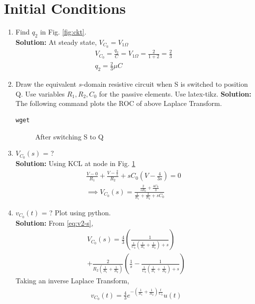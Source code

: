\documentclass[journal,12pt,twocolumn]{IEEEtran}
\newcommand{\solution}{\noindent \textbf{Solution: }}
\providecommand{\brak}[1]{\ensuremath{\left(#1\right)}}
\numberwithin{equation}{section}
\renewcommand\thesection{\arabic{section}}
\begin{document}
 \section{Initial Conditions}
\begin{enumerate}[label=\arabic*.,ref=\thesection.\theenumi]
\item Find $q_2$ in Fig. 
			\ref{fig:ckt}.\\
			\solution At steady state, $V_{C_0}=V_{1 \Omega}$
			\begin{align*}
			V_{C_0}=\frac{q_2}{C}=V_{1 \Omega}=\frac{2}{1+2}=\frac23\\
			q_2=\frac23 \mu C
			\end{align*}
\item Draw the equivalent $s$-domain resistive circuit when S is switched to position Q.  Use variables $R_1, R_2, C_0$ for the passive elements.
Use latex-tikz.
		\label{prob:init}
		\solution 
		The following command plots the ROC of above Laplace Transform.
	\begin{lstlisting}
wget 
\end{lstlisting}
	\begin{figure}[!ht]
 \centering
% 
\caption{After switching S to Q}
\label{fig:sq}
\end{figure}
		\item $V_{C_0}(s)$ = ? \\
		\solution Using KCL at node in Fig. \ref{fig:sq}
\begin{align}
    \frac{V - 0}{R_1} + \frac{V - \frac{2}{s}}{R_2} + sC_0\brak{V - \frac{4}{3s}} = 0 \\
\implies V_{C_0}(s) = \frac{\frac{2}{sR_2} + \frac{4C_0}{3}}{\frac{1}{R_1} + \frac{2}{R_2} + sC_0}
\label{eq:v2-s}
\end{align} 
	\item $v_{C_0}(t)$ = ? Plot using python.\\
	\solution From \eqref{eq:v2-s},
\begin{align}
    &V_{C_0}(s) = \frac{4}{3}\brak{\frac{1}{\frac{1}{C_0}\brak{\frac{1}{R_1} + \frac{1}{R_2}}+s}} \nonumber \\
    &+ \frac{2}{R_2\brak{\frac{1}{R_1} +\frac{1}{R_2}}}\brak{\frac{1}{s} - \frac{1}{\frac{1}{C_0}\brak{\frac{1}{R_1} + \frac{1}{R_2}} + s}}
\end{align}
Taking an inverse Laplace Transform,
\begin{align}
    &v_{C_0}(t) = \frac{4}{3}e^{-\brak{\frac{1}{R_1} + \frac{1}{R_2}}\frac{t}{C_0}}u(t) \nonumber \\ 

\end{align}
\end{enumerate}
\end{document}
